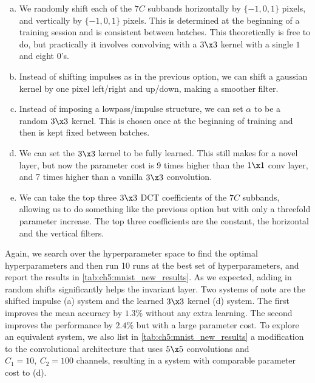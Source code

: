 \begin{enumerate}[(a)]
  \item We randomly shift each of the $7C$ subbands horizontally
    by $\{-1, 0, 1\}$ pixels, and vertically by $\{-1, 0, 1\}$ pixels. This is
    determined at the beginning of a training session and is consistent between
    batches. This theoretically is free to do, but practically it involves
    convolving with a $3 \x 3$ kernel with a single $1$ and eight $0$'s.
  \item Instead of shifting impulses as in the previous option, we can shift a
    gaussian kernel by one pixel left/right and up/down, making a smoother filter. 
  \item Instead of imposing a lowpass/impulse structure, we can set $\alpha$ to
    be a random $3\x 3$ kernel. This is chosen once at the beginning of training and then
    is kept fixed between batches.
  \item We can set the $3\x 3$ kernel to be fully learned. This
    still makes for a novel layer, but now the parameter cost is 9 times higher
    than the $1\x 1$ conv layer, and 7 times higher than a vanilla $3\x 3$
    convolution.
  \item We can take the top three $3\x 3$ DCT coefficients of the $7C$
    subbands, allowing us to do something like the previous option 
    but with only a threefold parameter increase. The top three coefficients are
    the constant, the horizontal and the vertical filters.
\end{enumerate}

Again, we search over the hyperparameter space to find the optimal
hyperparameters and then run 10 runs at the best set of hyperparameters, and
report the results in \autoref{tab:ch5:mnist_new_results}. As we expected,
adding in random shifts significantly helps the invariant layer. Two systems of
note are the shifted impulse (a) system and the learned $3\x 3$ kernel (d)
system. The first improves the mean accuracy by $1.3\%$ without any extra
learning. The second improves the performance by $2.4\%$ but with a large
parameter cost. To explore an equivalent system, we also list in
\autoref{tab:ch5:mnist_new_results} a modification to the convolutional
architecture that uses $5\x 5$ convolutions and $C_1 = 10,\ C_2 = 100$ channels,
resulting in a system with comparable parameter cost to (d).

